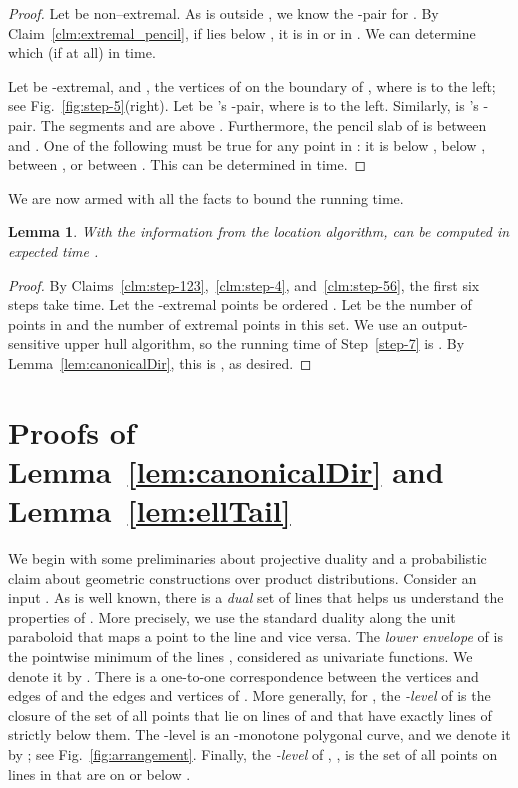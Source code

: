 \documentclass[letterpaper,11pt]{article}
\newtheorem{lemma}[theorem]{Lemma}
\begin{document}
\begin{proof} 
Let  be non--extremal.  
As  is outside , we know 
the -pair  for . 
By Claim~\ref{clm:extremal_pencil}, if
 lies below , it is in  or 
in . We can determine which (if at all)
in  time.

Let  be -extremal, and ,
 the vertices of  on the 
boundary of , where  is to the
left; see Fig.~\ref{fig:step-5}(right). 
Let  be 's -pair,
where  is to the left. 
Similarly,  is 's -pair.
The segments 
and  are above . Furthermore, 
the pencil slab of 
is between  and . One of the 
following must be true for any point in :
it is below , below 
, between ,
or between . This can be 
determined in  time.
\end{proof}

We are now armed with all the facts to bound the running time.

\begin{lemma}
  With the information from the location algorithm, 
   can be computed in expected time .
\end{lemma}

\begin{proof} 
By Claims~\ref{clm:step-123},~\ref{clm:step-4}, 
and~\ref{clm:step-56}, the  
first six steps take  time. Let 
the -extremal points
be ordered . Let 
 be the number of points
in  and  
the number of extremal points
in this set. We use an output-sensitive
upper hull algorithm, so
the running time of Step~\ref{step-7} is 
.
By Lemma~\ref{lem:canonicalDir}, this
is , as desired.
\end{proof}

\section{Proofs of 
  Lemma~\ref{lem:canonicalDir} and 
  Lemma~\ref{lem:ellTail}}
\label{sec:lproofs}

We begin with some preliminaries
about projective duality and 
a probabilistic claim
about geometric constructions 
over product distributions.
Consider an input .
As is well known, there is a 
\emph{dual} set  of lines
that helps us understand 
the properties of . More 
precisely, we use the standard
duality along the unit paraboloid 
that maps a point  
to the line 
and vice versa. The \emph{lower envelope} 
of  is the
pointwise minimum of the  
lines , 
considered as univariate functions. 
We denote it by .
There is a one-to-one correspondence 
between the vertices and edges of 
 and the edges and 
vertices of . 
More generally, for , 
the \emph{-level} of  is 
the closure of the set of all points 
that lie on lines of  and that 
have exactly  lines of  strictly 
below them.  The -level is 
an -monotone polygonal curve, 
and we denote it by ; 
see Fig.~\ref{fig:arrangement}.
Finally, the \emph{-level} 
of , , is the
set of all points on lines in  that 
are on or below . 
\end{document}
